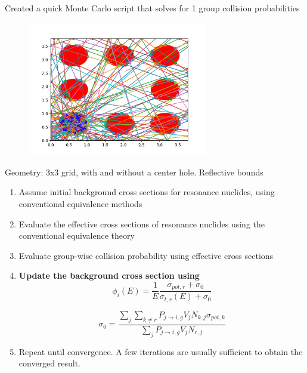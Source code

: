 \documentclass{beamer}
\begin{document}
\begin{frame}
  Created a quick Monte Carlo script that solves for 1 group collision probabilities 
\begin{figure}
\includegraphics[width=0.7\textwidth]{collisionProb1}
\end{figure}
  Geometry: 3x3 grid, with and without a center hole. Reflective bounds



\end{frame}



    \begin{frame}
      \begin{enumerate}
        \item Assume initial background cross sections for resonance nuclides, using conventional equivalence methods
        \item Evaluate the effective cross sections of resonance nuclides using the conventional equivalence theory
        \item Evaluate group-wise collision probability using effective cross sections 
        \item \textbf{Update the background cross section using}
\begin{equation*}\phi_i(E)=\frac{1}{E}\frac{\sigma_{pot,r}+\sigma_{0}}{\sigma_{t,r}(E)+\sigma_{0}}\end{equation*}

\begin{equation*}\sigma_{0}=\frac{\sum\limits_j\sum\limits_{k\neq r}P_{j\rightarrow i,g}V_{j}N_{k,j}\sigma_{pot,k}}{\sum\limits_jP_{j\rightarrow i,g}V_{j}N_{r,j}}\end{equation*}


        \item Repeat until convergence. A few iterations are usually sufficient to obtain the converged result.
      \end{enumerate}
\end{frame}
\end{document}
